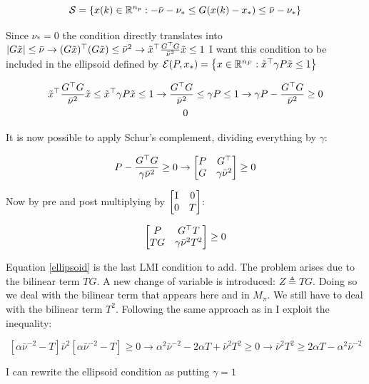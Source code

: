 \documentclass{article}
\begin{document}
$$
  {\mathcal{S}} = \left\{ x(k) \in {\mathbb{R}}^{n_{p}} : -\bar{\nu} - \nu_* \leq G (x(k) - x_*) \leq \bar{\nu} - \nu_* \right\}
$$

Since $\nu_* = 0$ the condition directly translates into $|G \tilde{x}| \leq \bar{\nu} \to (G \tilde{x})^\top (G \tilde{x}) \leq \bar{\nu}^2 \to \tilde{x}^\top \frac{G^\top G}{\bar{\nu}^{2}} \tilde{x} \leq 1$ I want this condition to be included in the ellipsoid defined by ${\mathcal{E}}(P, x_*) = \left\{ x \in {\mathbb{R}}^{n_{F}}: \tilde{x}^\top \gamma P \tilde{x} \leq 1 \right\}$

\begin{multline*}
  \tilde{x}^\top \frac{G^\top G}{\bar{\nu}^{2}} \tilde{x} \leq \tilde{x}^\top \gamma P \tilde{x} \leq 1 \to \frac{G^\top G}{\bar{\nu}^{2}} \leq \gamma P \leq 1 \to \gamma P - \frac{G^\top G}{\bar{\nu}^{2}} \geq 0\\
  0
\end{multline*}

It is now possible to apply Schur's complement, dividing everything by $\gamma$:

\begin{equation}
  P - \frac{G^\top G}{\gamma \bar{\nu}^{2}} \geq 0 \to \left[\begin{matrix}P & G^\top\\ G & \gamma \bar{\nu}^{2}\end{matrix}\right] \geq 0
\end{equation}

Now by pre and post multiplying by $\left[\begin{matrix}\operatorname{I} & 0\\ 0 & T\end{matrix}\right]$:

\begin{equation}\label{ellipsoid}
  \left[\begin{matrix}P & G^\top T\\
  TG & \gamma \bar{\nu}^{2} T^{2}\end{matrix}\right] \geq 0
\end{equation}

Equation \ref{ellipsoid} is the last LMI condition to add. The problem arises due to the bilinear term $TG$. A new change of variable is introduced: $Z \triangleq TG$. Doing so we deal with the bilinear term that appears here and in $M_{\pi}$. We still have to deal with the bilinear term $T^{2}$. Following the same approach as in \cite{css-extended} I exploit the inequality:

$$
  \left[ \alpha \bar{\nu}^{-2} - T \right] \bar{\nu}^{2}\left[ \alpha \bar{\nu}^{-2} - T \right] \geq 0 \to \alpha^{2} \bar{\nu}^{-2} - 2 \alpha T + \bar{\nu}^{2} T^{2} \geq 0 \to \bar{\nu}^{2} T^{2} \geq 2 \alpha T - \alpha^{2} \bar{\nu}^{-2}
$$

I can rewrite the ellipsoid condition as putting $\gamma = 1$
\end{document}
